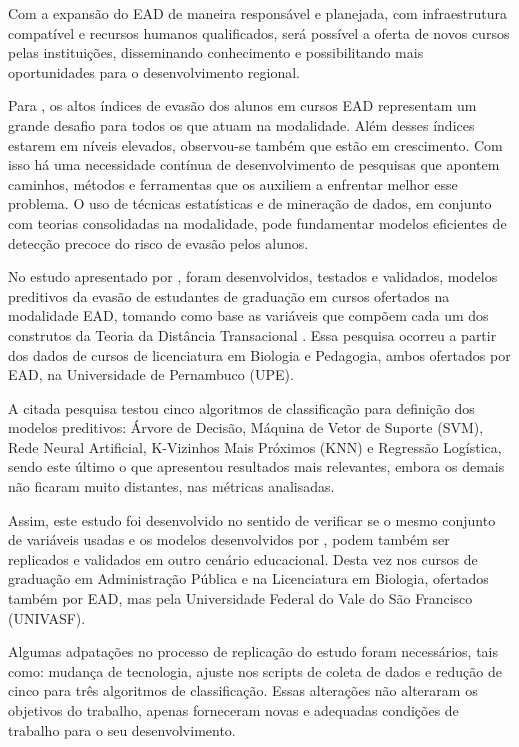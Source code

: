 Com a expansão do EAD de maneira responsável e planejada, com infraestrutura
compatível e recursos humanos qualificados, será possível a oferta de novos
cursos pelas instituições, disseminando conhecimento e possibilitando mais
oportunidades para o desenvolvimento regional.

Para , os altos índices de evasão dos alunos em cursos 
EAD representam um grande desafio para todos os que atuam na modalidade. Além desses 
índices estarem em níveis elevados, observou-se também que estão em crescimento. 
Com isso há uma necessidade contínua de desenvolvimento de pesquisas que apontem caminhos,
métodos e ferramentas que os auxiliem a enfrentar melhor esse problema. O uso de
técnicas estatísticas e de mineração de dados, em conjunto com teorias
consolidadas na modalidade, pode fundamentar modelos eficientes de detecção
precoce do risco de evasão pelos alunos.

No estudo apresentado por , foram desenvolvidos, 
testados e validados, modelos preditivos da evasão de estudantes de graduação em 
cursos ofertados na modalidade EAD, tomando como base as variáveis que compõem cada 
um dos construtos da Teoria da Distância Transacional \cite{moore2008teoria}. Essa 
pesquisa ocorreu a partir dos dados de cursos de licenciatura em Biologia e Pedagogia,
ambos ofertados por EAD, na Universidade de Pernambuco (UPE).

A citada pesquisa testou cinco algoritmos de classificação para definição dos modelos preditivos:  
Árvore de Decisão, Máquina de Vetor de Suporte (SVM), Rede Neural Artificial, K-Vizinhos 
Mais Próximos (KNN) e Regressão Logística, sendo este último o que apresentou resultados mais
relevantes, embora os demais não ficaram muito distantes, nas métricas analisadas.

Assim, este estudo foi desenvolvido no sentido de verificar se o mesmo conjunto de variáveis 
usadas e os modelos desenvolvidos por , podem também 
ser replicados e validados em outro cenário educacional. Desta vez nos cursos 
de graduação em Administração Pública e na Licenciatura em Biologia, ofertados também 
por EAD, mas pela Universidade Federal do Vale do São Francisco (UNIVASF).

Algumas adpatações no processo de replicação do estudo foram necessários, tais como: mudança 
de tecnologia, ajuste nos scripts de coleta de dados e redução de cinco para três algoritmos 
de classificação. Essas alterações não alteraram os objetivos do trabalho, apenas forneceram
novas e adequadas condições de trabalho para o seu desenvolvimento.


